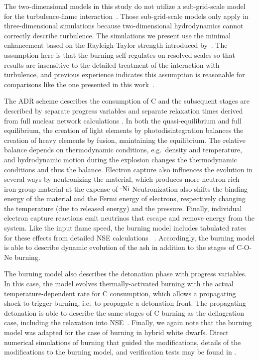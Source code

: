 \documentclass[iop,apj]{emulateapj}
\newcommand{\Ni}[1]{\ensuremath{{}^{#1}{\rm Ni}}}
\begin{document}
The two-dimensional models in this study do not utilize a sub-grid-scale
model for the turbulence-flame
interaction~\citep[See][for examples]{Schmetal06a,Schmetal06b,jacketal2014}.
Those sub-grid-scale models only apply in three-dimensional
simulations because two-dimensional hydrodynamics cannot
correctly describe turbulence. The simulations we present
use the minimal enhancement based on the Rayleigh-Taylor
strength introduced by~\citet{townsley.calder.ea:flame}. The
assumption here is that the burning self-regulates on resolved
scales so that results are insensitive to the detailed treatment
of the interaction with turbulence, and previous experience
indicates this assumption is reasonable for comparisons
like the one presented in this work~\citep{townsley.calder.ea:flame,
willcoxetal2016}.

The ADR scheme describes the consumption of C and the subsequent stages
are described by separate progress variables and
separate relaxation times derived from full nuclear network calculations
\cite{Caldetal07,townetal2016}. In both the quasi-equilibrium and full equilibrium,
the creation of light elements by photodisintegration balances the creation of heavy
elements by fusion, maintaining the equilibrium. The relative balance depends on
thermodynamic conditions, e.g.\ density and temperature, and hydrodynamic motion
during the explosion changes the thermodynamic conditions and thus the
balance.
{\color{blue} Electron capture also influences the evolution in several ways by
neutronizing the material, which produces more neutron rich iron-group
material at the expense of \Ni. Neutronization also shifts the binding
energy of the material and the Fermi energy of electrons, respectively
changing the temperature (due to released energy) and the pressure.
Finally, individual electron capture reactions emit neutrinos that
escape and remove energy from the system.}
Like the input flame speed, the burning model includes tabulated rates for these effects
from detailed NSE calculations ~\citep{SeitTownetal09}. Accordingly, the burning
model is able to describe dynamic evolution of the ash in addition to the
stages of C-O-Ne burning.

The burning model also describes the detonation phase with progress variables.
In this case, the model evolves thermally-activated burning with the actual
temperature-dependent rate for C consumption, which allows a propagating shock to
trigger burning, i.e.\ to propagate a detonation front. The propagating detonation
is able to describe the same stages of C burning as the deflagration case, including
the relaxation into NSE~\cite[and references therein]{townetal2016}. Finally,
we again note that the burning model was adapted for the case of burning in
hybrid white dwarfs. Direct numerical simulations of burning that guided
the modifications, details of the modifications to the burning model, and
verification tests may be found in \citet{willcoxetal2016}.
\end{document}
